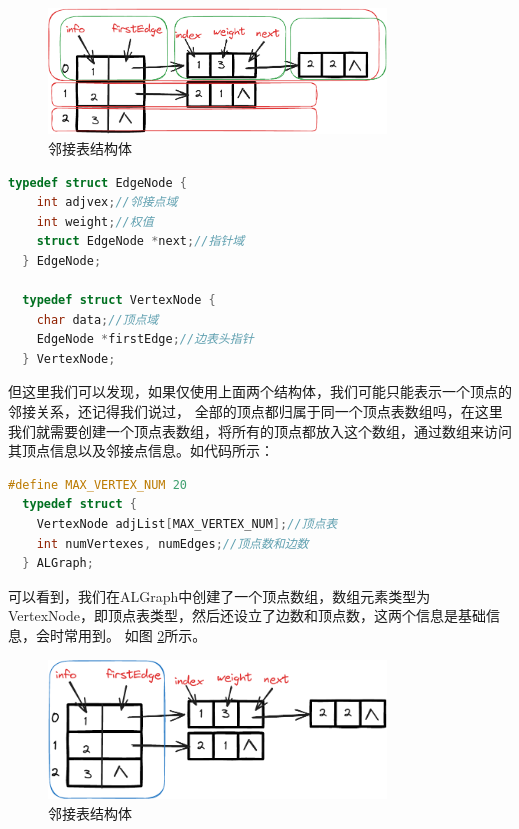 \documentclass[lang=cn,newtx,10pt,scheme=chinese]{../elegantbook}
\begin{document}
\begin{figure}[h!]
  \centering
  \includegraphics[width=0.8\textwidth]{./figure/pdf/cropped/adjacencyList_struct2.pdf}
  \caption{邻接表结构体}
  \label{fig:adjacencyList_struct2}

\end{figure}

\begin{lstlisting}[language=C++, caption={邻接表结构体}]
  typedef struct EdgeNode {
    int adjvex;//邻接点域
    int weight;//权值
    struct EdgeNode *next;//指针域
  } EdgeNode;

  typedef struct VertexNode {
    char data;//顶点域
    EdgeNode *firstEdge;//边表头指针
  } VertexNode;

\end{lstlisting}

但这里我们可以发现，如果仅使用上面两个结构体，我们可能只能表示一个顶点的邻接关系，还记得我们说过，
全部的顶点都归属于同一个顶点表数组吗，在这里我们就需要创建一个顶点表数组，将所有的顶点都放入这个数组，通过数组来访问其顶点信息以及邻接点信息。如代码所示：

\begin{lstlisting}[language=C++, caption={邻接表结构体}]
  #define MAX_VERTEX_NUM 20
  typedef struct {
    VertexNode adjList[MAX_VERTEX_NUM];//顶点表
    int numVertexes, numEdges;//顶点数和边数
  } ALGraph;
\end{lstlisting}

可以看到，我们在ALGraph中创建了一个顶点数组，数组元素类型为VertexNode，即顶点表类型，然后还设立了边数和顶点数，这两个信息是基础信息，会时常用到。
如图 \ref{fig:adjacencyList_struct3}所示。

\begin{figure}[h!]
  \centering
  \includegraphics[width=0.8\textwidth]{./figure/pdf/cropped/adjList_array.pdf}
  \caption{邻接表结构体}
  \label{fig:adjacencyList_struct3}
\end{figure}
\end{document}
